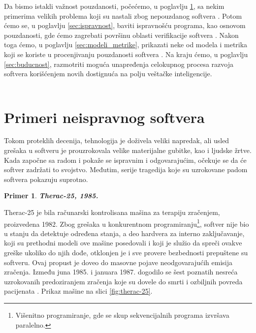 \documentclass[a4paper]{article}
\newtheorem{primer}{Primer}[section]
\begin{document}
Da bismo istakli važnost pouzdanosti, počećemo, u poglavlju \ref{sec:neispravni_softver}, sa nekim primerima velikih problema koji su nastali zbog nepouzdanog softvera \cite{quinn_ethics}.
Potom ćemo se, u poglavlju \ref{sec:ispravnost}, baviti ispravnošću programa, kao osnovom pouzdanosti, gde ćemo zagrebati površinu oblasti verifikacije softvera \cite{laski2009software}.
Nakon toga ćemo, u poglavlju \ref{sec:modeli_metrike}, prikazati neke od modela i metrika koji se koriste u procenjivanju pouzdanosti softvera \cite{pham_reliability}.
Na kraju ćemo, u poglavlju \ref{sec:buducnost}, razmotriti moguća unapređenja celokupnog procesa razvoja softvera korišćenjem novih dostignuća na polju veštačke inteligencije.\\\\


\section{Primeri neispravnog softvera}
\label{sec:neispravni_softver}

Tokom proteklih decenija, tehnologija je doživela veliki napredak, ali usled grešaka u softveru je prouzrokovala velike materijalne gubitke, kao i ljudske žrtve. Kada započne sa radom i pokaže se ispravnim i odgovarajućim, očekuje se da će softver zadržati to svojstvo. Međutim, serije tragedija koje su uzrokovane padom softvera pokazuju suprotno.\\

\begin{primer}
\textbf{Therac-25, 1985.}
\end{primer}
Therac-25 je bila računarski kontrolisana mašina za terapiju zračenjem, proizvedena 1982.
Zbog grešaka u konkurentnom programiranju\footnote{ Višenitno programiranje, gde se skup sekvencijalnih programa izvršava paralelno.}, softver nije bio u stanju da detektuje određena stanja, a deo hardvera za interno zaključavanje, koji su prethodni modeli ove mašine posedovali i koji je služio da spreči ovakve greške ukoliko do njih dođe, otklonjen je i sve provere bezbednosti prepuštene su softveru. Ovaj propust je doveo do masovne pojave neodgovarajućih emisija zračenja.
Između juna 1985. i januara 1987. dogodilo se šest poznatih nesreća uzrokovanih predoziranjem zračenja koje su dovele do smrti i ozbiljnih povreda pacijenata \cite{therac25}. Prikaz mašine na slici \ref{fig:therac-25}.
\end{document}
